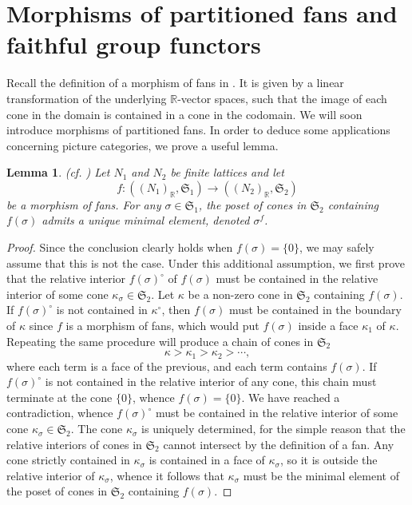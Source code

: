 \documentclass[10pt,twoside, a4paper,reqno]{amsart}
\newcommand{\R}{\mathbb{R}}
\newcommand{\Sfan}{\mathfrak{S}}
\newtheorem{lemma}[theorem]{Lemma}
\theoremstyle{definition}
\begin{document}
\section{Morphisms of partitioned fans and faithful group functors}\label{sec:morpartfan}

Recall the definition of a morphism of fans in . It is given by a linear transformation of the underlying {$\R$-vector} spaces, such that the image of each cone in the domain is contained in a cone in the codomain. We will soon introduce morphisms of partitioned fans. In order to deduce some applications concerning picture categories, we prove a useful lemma. 


\begin{lemma}\label{lem:morpartfan}
    (cf. \cite[Second exercise on p. 42]{Ful93})
    Let $N_1$ and $N_2$ be finite lattices and let 
    \[f\colon ({(N_1)_{\R}},\Sfan_1) \xrightarrow{}({(N_2)_{\R}},\Sfan_2)\]
    be a morphism of fans. For any $\sigma\in \Sfan_1$, the poset of cones in $\Sfan_2$ containing $f(\sigma)$ admits a unique minimal element, denoted $\sigma^f$.
\end{lemma}
\begin{proof}
    Since the conclusion clearly holds when $f(\sigma)=\{0\}$, we may safely assume that this is not the case. 
    Under this additional assumption, we first prove that the {relative} interior $f(\sigma)^{\circ}$ of $f(\sigma)$ must be contained in the {relative} interior of some cone ${\kappa}_{\sigma}\in\Sfan_2$. Let ${\kappa}$ be a non-zero cone in $\Sfan_2$ containing $f(\sigma)$. If $f(\sigma)^{\circ}$ is not contained in ${\kappa}^{\circ}$, then $f(\sigma)$ must be contained in the boundary of ${\kappa}$ {since $f$ is a morphism of fans}, which would put $f(\sigma)$ inside a face ${\kappa}_1$ of ${\kappa}$. Repeating the same procedure will produce a chain of cones in $\Sfan_2$
    \begin{equation*}
        {\kappa} > {\kappa}_1 > {\kappa}_2 > \cdots,
    \end{equation*}
    where each term is a face of the previous, and each term contains $f(\sigma)$. If $f(\sigma)^{\circ}$ is not contained in the relative interior of any cone, this chain must terminate at the cone $\{0\}$, whence $f(\sigma)=\{0\}$. We have reached a contradiction, whence $f(\sigma)^{\circ}$ must be contained in the relative interior of some cone ${\kappa}_{\sigma}\in\Sfan_2$.
    The cone ${\kappa}_{\sigma}$ is uniquely determined, for the simple reason that the relative interiors of cones in $\Sfan_2$ cannot intersect {by the definition of a fan}. 
    Any cone strictly contained in ${\kappa}_{\sigma}$ is contained in a face of ${\kappa}_{\sigma}$, so it is outside the relative interior of ${\kappa}_{\sigma}$, whence it follows that ${\kappa}_{\sigma}$ must be the minimal element of the poset of cones in $\Sfan_2$ containing $f(\sigma)$.
\end{proof}
\end{document}
